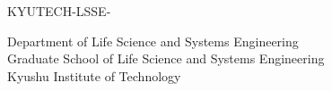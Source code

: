 \renewcommand\thepage{Title1}
\thispagestyle{empty}
{\raggedleft
 \normalsize KYUTECH-LSSE-\studentnumber \\
}

\vspace*{9truemm}
\begin{center}
 \Large\bfseries\edoctitle
\end{center}

\vspace*{27truemm}
\begin{center}
 \Large\bfseries\etitle
\end{center}

\vspace*{18truemm}
\begin{center}
 \Large\eauthor
\end{center}

\vspace*{45truemm}
\begin{center}
 \edate
\end{center}

\vspace*{4truemm}
\begin{center}
 Department of Life Science and Systems Engineering \\
 Graduate School of Life Science and Systems Engineering \\
 Kyushu Institute of Technology
\end{center}
\vspace*{\fill}
